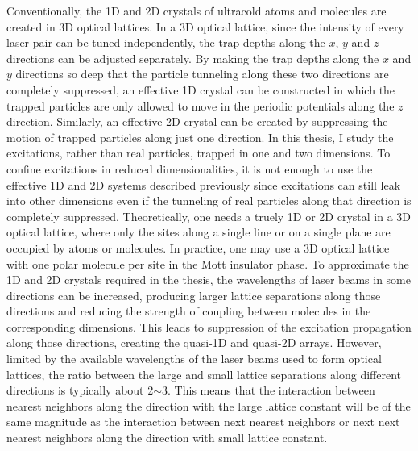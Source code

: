 Conventionally, the 1D and 2D crystals of ultracold atoms and molecules are created in 3D optical lattices. In a 3D 
optical lattice, since the intensity of every laser pair can be tuned independently, the trap depths along the $x$,
$y$ and $z$ directions can be adjusted separately. By making the trap depths along the $x$ and $y$ directions so deep
that the particle tunneling along these two directions are completely suppressed, an effective 1D crystal can be constructed
in which the trapped particles are only allowed to move in the periodic potentials along the $z$ direction. Similarly, an effective 2D crystal
can be created by suppressing the motion of trapped particles along just one direction. 
 In  this thesis, I study the excitations, rather than real particles,  trapped in one and two dimensions. 
To confine excitations in reduced dimensionalities, it is not enough to use the effective 1D and 2D systems described 
previously since excitations can still leak into other dimensions even if the tunneling of real particles along that direction is 
completely suppressed. 
Theoretically, one needs a truely 1D or 2D crystal in a 3D optical lattice, where only the sites along a single line 
or on a single plane are occupied by atoms or molecules. 
 In practice, one may use a 3D optical lattice with one polar molecule per site in the Mott insulator 
phase. To approximate the 1D and 2D crystals required in the thesis, the wavelengths of laser beams in some directions 
can be increased, producing larger lattice separations along those directions and reducing the strength of coupling between 
molecules in the corresponding dimensions. This leads to suppression of the excitation propagation along those directions,
creating the quasi-1D and quasi-2D arrays. 
However, limited by the available wavelengths of the laser beams used to form optical lattices, the ratio between the large 
and small lattice separations along different directions is typically about 2$\sim$3. This means that the interaction 
between nearest neighbors along the direction with the large lattice constant will be of the same magnitude as the 
interaction between next nearest neighbors or next next nearest neighbors along the direction with small lattice constant.
